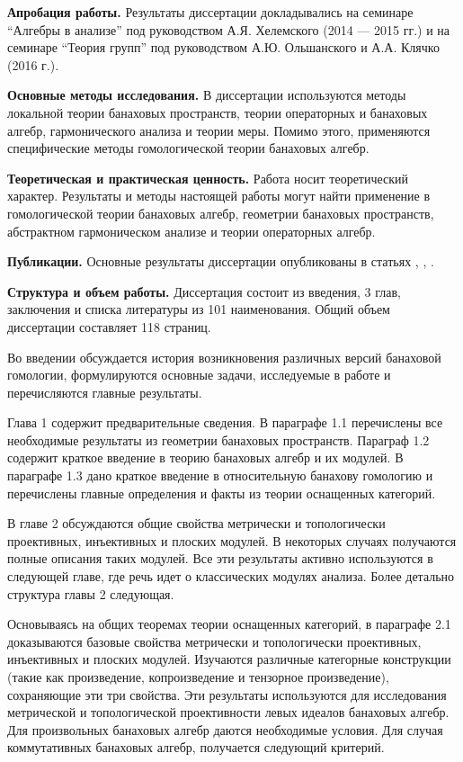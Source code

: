 \textbf{Апробация работы.} Результаты диссертации докладывались  на семинаре ``Алгебры в анализе'' под руководством А.Я. Хелемского  (2014 — 2015 гг.) и на семинаре ``Теория групп'' под руководством А.Ю. Ольшанского и А.А. Клячко (2016 г.).

\textbf{Основные методы исследования.} В диссертации используются методы локальной теории банаховых пространств, теории операторных и банаховых алгебр, гармонического анализа и теории меры. Помимо этого, применяются специфические методы гомологической теории банаховых алгебр.

\textbf{Теоретическая и практическая ценность.} Работа носит теоретический характер. Результаты и методы настоящей работы могут найти применение в гомологической теории банаховых алгебр, геометрии банаховых пространств, абстрактном гармоническом анализе и теории операторных алгебр.

\textbf{Публикации.} Основные результаты диссертации опубликованы в статьях \cite{NemMetTopProjIdBanAlg}, \cite{NemTopInjCStarAlg}, \cite{NemHomolTrivCatModLp}.

\textbf{Структура и объем работы.} Диссертация состоит из введения, 3 глав, заключения и списка литературы
из 101 наименования. Общий объем диссертации составляет 118 страниц.

Во введении обсуждается история возникновения различных версий банаховой гомологии, формулируются основные задачи, исследуемые в работе и перечисляются главные результаты.

Глава 1 содержит предварительные сведения. В параграфе 1.1 перечислены все необходимые результаты из геометрии банаховых пространств. Параграф 1.2 содержит краткое введение в теорию банаховых алгебр и их модулей. В параграфе 1.3 дано краткое введение в относительную банахову гомологию и перечислены главные определения и факты из теории оснащенных категорий.

В главе 2 обсуждаются общие свойства метрически и топологически проективных, инъективных и плоских модулей. В некоторых случаях получаются полные описания таких модулей. Все эти результаты активно используются в следующей главе, где речь идет о классических модулях анализа. Более детально структура главы 2 следующая. 

Основываясь на общих теоремах теории оснащенных категорий, в параграфе 2.1 доказываются базовые свойства метрически и топологически проективных, инъективных и плоских модулей. Изучаются различные категорные конструкции (такие как произведение, копроизведение и тензорное произведение), сохраняющие эти три свойства. Эти результаты используются для исследования метрической и топологической проективности левых идеалов банаховых алгебр. Для произвольных банаховых алгебр даются необходимые условия. Для случая коммутативных банаховых алгебр, получается следующий критерий.

